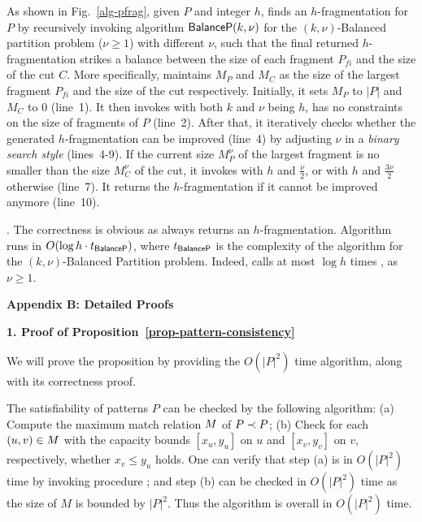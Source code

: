 As shown in Fig.~\ref{alg-pfrag}, given $P$ and integer $h$,
 finds an $h$-fragmentation for $P$ by recursively invoking algorithm ${\mathsf{BalanceP}}(k,\nu)$ for the {\sc $(k,\nu)$-Balanced partition} problem ($\nu\geq 1$) with different $\nu$,
such that the final returned $h$-fragmentation strikes a balance between the size of each fragment ${P}_{fi}$ and the size of the cut $C$.
More specifically,  maintains $M_P$ and $M_C$ as the size of the largest fragment ${P}_{fi}$ and the size of the cut respectively.
Initially, it sets $M_P$ to $|P|$ and $M_C$ to 0 (line~1).
It then invokes  with both $k$ and $\nu$ being $h$, \ie has no constraints on the size of fragments of $P$ (line~2).
After that, it iteratively checks whether the generated $h$-fragmentation can be improved (line~4) by adjusting $\nu$ in a {\em binary search style} (lines~4-9).
If the current size $M^\nu_P$ of the largest fragment is no smaller than the size $M^\nu_C$ of the cut,
it invokes  with $h$ and $\frac{\nu}{2}$, or with $h$ and $\frac{3\nu}{2}$ otherwise (line~7).
It returns the $h$-fragmentation if it cannot be improved anymore (line~10).

\vspace{-1.5ex}
.
The correctness is obvious as  always returns an $h$-fragmentation.
Algorithm~ runs in $O(\log h\cdot t_{{\mathsf{BalanceP}}})$, where $t_{{\mathsf{BalanceP}}}$ is the complexity of the algorithm for the {\sc $(k,\nu)$-Balanced Partition} problem. Indeed,  calls at most $\log h$ times , as $\nu\geq 1$.


\vspace{1ex}
\noindent
{\large \textbf{Appendix B: Detailed Proofs}}
\label{sec-apd-proofs}

\noindent
{\textbf{1. Proof of Proposition~\ref{prop-pattern-consistency}}}

We will prove the proposition by providing the $O(|P|^2)$ time algorithm, along with its correctness proof.

\vspace{-1.5ex}
The satisfiability of patterns $P$ can be checked by the following algorithm:
(a) Compute the maximum match relation $M$ of $P \prec P$;
(b) Check for each $(u, v)\in M$ with the capacity bounds $[x_u, y_u]$ on $u$ and $[x_v, y_v]$ on $v$, respectively, whether $x_v \leq y_u$ holds.
One can verify that step (a) is in $O(|P|^2)$ time by invoking procedure \rgraphsim; and step (b) can be checked in $O(|P|^2)$ time as the size of $M$ is bounded by $|P|^2$. Thus the algorithm is overall in $O(|P|^2)$ time.

